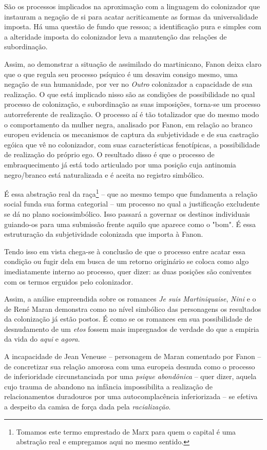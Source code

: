 São os processos implicados na aproximação com a linguagem do
colonizador que instauram a negação de si para acatar acriticamente as
formas da universalidade imposta. Há uma questão de fundo que ressoa; a
identificação pura e simples com a alteridade imposta do colonizador
leva a manutenção das relações de subordinação.

Assim, ao demonstrar a situação de assimilado do martinicano, Fanon
deixa claro que o que regula seu processo psíquico é um desavim consigo
mesmo, uma negação de sua humanidade, por ver no \emph{Outro}
colonizador a capacidade de sua realização. O que está implicado nisso
são as condições de possibilidade no qual processo de colonização, e
subordinação as suas imposições, torna-se um processo autorreferente de
realização. O processo aí é tão totalizador que do mesmo modo o
comportamento da mulher negra, analisado por Fanon, em relação ao branco
europeu evidencia os mecanismos de captura da subjetividade e de sua
castração egóica que vê no colonizador, com suas características
fenotípicas, a possibilidade de realização do próprio ego. O resultado
disso é que o processo de embraquecimento já está todo articulado por
uma posição cuja antinomia negro/branco está naturalizada e é aceita no
registro simbólico.

É essa abstração real da raça\footnote{Tomamos este termo emprestado de
  Marx para quem o capital é uma abstração real e empregamos aqui no
  mesmo sentido.} -- que ao mesmo tempo que fundamenta a relação social
funda sua forma categorial -- um processo no qual a justificação
excludente se dá no plano sociossimbólico. Isso passará a governar os
destinos individuais guiando-os para uma submissão frente aquilo que
aparece como o "bom". É essa estruturação da subjetividade colonizada
que importa à Fanon.

Tendo isso em vista chega-se à conclusão de que o processo entre acatar
essa condição ou fugir dela em busca de um retorno originário se coloca
como algo imediatamente interno ao processo, quer dizer: as duas
posições são coniventes com os termos erguidos pelo colonizador.

Assim, a análise empreendida sobre os romances \emph{Je suis
Martiniquaise}, \emph{Nini} e o de René Maran demonstra como no nível
simbólico das personagens os resultados da colonização já estão postos.
É como se os romances em sua possibilidade de desnudamento de um
\emph{etos} fossem mais impregnados de verdade do que a empiria da vida
do \emph{aqui} e \emph{agora}.

A incapacidade de Jean Veneuse -- personagem de Maran comentado por
Fanon -- de concretizar sua relação amorosa com uma europeia desnuda
como o processo de inferioridade circunstanciada por uma \emph{psique
abondônica} -- quer dizer, aquela cujo trauma de abandono na infância
impossibilita a realização de relacionamentos duradouros por uma
autocomplacência inferiorizada -- se efetiva a despeito da camisa de
força dada pela \emph{racialização}.

